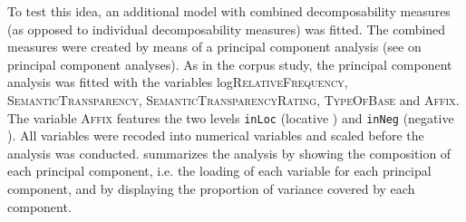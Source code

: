 To test this idea, an additional model with combined decomposability measures (as opposed to individual decomposability measures) was fitted. The combined measures were created by means of a principal component analysis (see  on principal component analyses). 
As in the corpus study, the principal component analysis was fitted with the variables log\textsc{RelativeFrequency}, \textsc{SemanticTransparency}, \textsc{SemanticTransparencyRating}, \textsc{TypeOfBase} and \textsc{Affix}. The variable \textsc{Affix} features the two levels \texttt{inLoc} (locative ) and \texttt{inNeg} (negative ). All variables were recoded into numerical variables and scaled before the analysis was conducted. 
 summarizes the analysis by showing the composition of each principal component, i.e. the loading of each variable for each principal component, and by displaying the proportion of variance covered by each component. 


\begin{table}
	\caption{Summary of principal components\label{tbl: summary PC in exp}}
\end{table}

